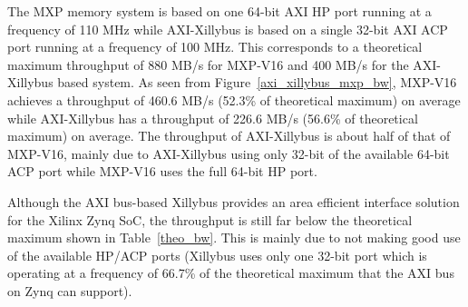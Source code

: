 

The MXP memory system is based on one 64-bit AXI HP port running at a frequency of 110 MHz while AXI-Xillybus is based on a single 32-bit AXI ACP port running at a frequency of 100 MHz. 
This corresponds to a theoretical maximum throughput of 880 MB/s for MXP-V16 and 400 MB/s for the AXI-Xillybus based system. 
As seen from Figure~\ref{axi_xillybus_mxp_bw}, MXP-V16 achieves a throughput of 460.6 MB/s (52.3\% of theoretical maximum) on average while AXI-Xillybus has a throughput of 226.6 MB/s (56.6\% of theoretical maximum) on average. 
The throughput of AXI-Xillybus is about half of that of MXP-V16, mainly due to AXI-Xillybus using only 32-bit of the available 64-bit ACP port while MXP-V16 uses the full 64-bit HP port. 


\begin{table}[tb]
	\caption{Area overhead of AXI bus-based systems.}
	\label{xillybus_mxp_area}
	\centering
\end{table}

Although the AXI bus-based Xillybus provides an area efficient interface solution for the Xilinx Zynq SoC, the throughput is still far below the theoretical maximum shown in Table~\ref{theo_bw}. 
This is mainly due to not making good use of the available HP/ACP ports (Xillybus uses only one 32-bit port which is operating at a frequency of 66.7\% of the theoretical maximum that the AXI bus on Zynq can support). 



